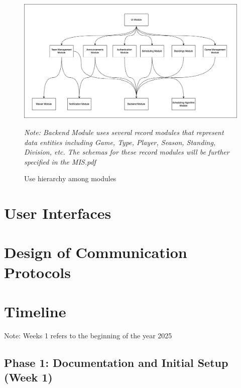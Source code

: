 \documentclass[12pt, titlepage]{article}
\begin{document}
\begin{figure}[H]
\centering
\includegraphics[width=1.1\textwidth]{module-decomp.png}
\caption{Use hierarchy among modules}
\textit{Note: Backend Module uses several record modules that represent data entities including Game, Type, Player, Season, Standing, Division, etc. The schemas for these record modules will be further specified in the MIS.pdf}
\label{FigUH}
\end{figure}


\section{User Interfaces}


\section{Design of Communication Protocols}


\section{Timeline}

Note: Weeks 1 refers to the beginning of the year 2025

\subsection*{Phase 1: Documentation and Initial Setup (Week 1)}
\end{document}
